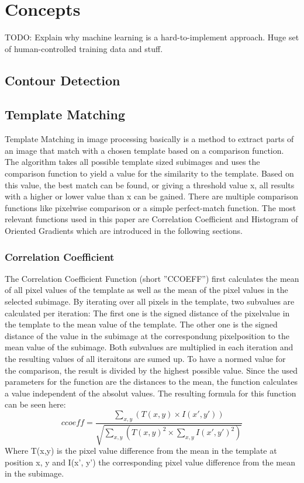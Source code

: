 \section{Concepts}
\label{sec_concepts}

TODO: Explain why machine learning is a hard-to-implement approach. Huge set of human-controlled training data and stuff.

\subsection{Contour Detection}
\subsection{Template Matching}
Template Matching in image processing basically is a method to extract parts of an image that match with a chosen template based on a comparison function.
The algorithm takes all possible template sized subimages and uses the comparison function to yield a value for the similarity to the template.
Based on this value, the best match can be found, or giving a threshold value x, all results with a higher or lower value than x can be gained.
There are multiple comparison functions like pixelwise comparison or a simple perfect-match function.
The most relevant functions used in this paper are Correlation Coefficient and Histogram of Oriented Gradients which are introduced in the following sections.

\subsubsection{Correlation Coefficient}
The Correlation Coefficient Function (short ''CCOEFF'') first calculates the mean of all pixel values of the template as well as the mean of the pixel values in the selected subimage.
By iterating over all pixels in the template, two subvalues are calculated per iteration:
The first one is the signed distance of the pixelvalue in the template to the mean value of the template.
The other one is the signed distance of the value in the subimage at the correspondung pixelposition to the mean value of the subimage.
Both subvalues are multiplied in each iteration and the resulting values of all iteraitons are sumed up.
To have a normed value for the comparison, the result is divided by the highest possible value.
Since the used parameters for the function are the distances to the mean, the function calculates a value independent of the absolut values.
The resulting formula for this function can be seen here:
\[ccoeff = \frac{\sum_{x,y} (T(x,y) \times I(x',y'))}{\sqrt{\sum_{x,y} (T(x,y)^2 \times \sum_{x,y} I(x',y')^2)}} \]
Where T(x,y) is the pixel value difference from the mean in the template at position x, y and I(x', y') the corresponding pixel value difference from the mean in the subimage.
